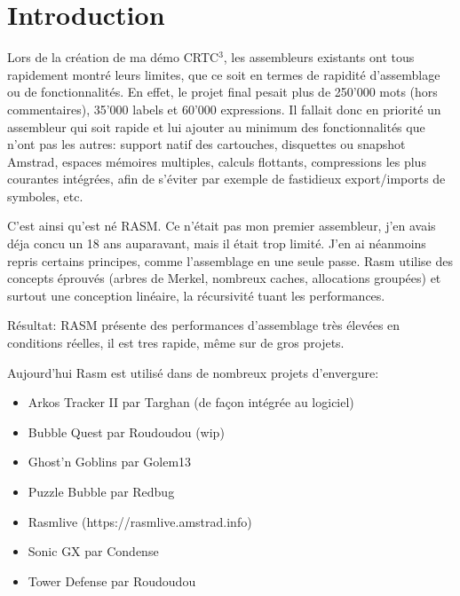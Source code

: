 \section{Introduction}

\begin{xfr}
Lors de la création de ma démo CRTC$^3$, les assembleurs existants ont tous rapidement montré leurs limites, que ce soit en termes de rapidité d'assemblage ou de fonctionnalités.
En effet, le projet final pesait plus de 250'000 mots (hors commentaires), 35'000 labels et 60'000 expressions.
Il fallait donc en priorité un assembleur qui soit rapide et lui ajouter au minimum des fonctionnalités que n'ont pas les autres: support natif des cartouches, disquettes ou snapshot Amstrad, espaces mémoires multiples, calculs flottants, compressions les plus courantes intégrées, afin de s'éviter par exemple de fastidieux export/imports de symboles, etc.

\medskip
C'est ainsi qu'est né RASM. Ce n'était pas mon premier assembleur, j'en avais déja concu un 18 ans auparavant, mais il était trop limité. J'en ai néanmoins repris certains principes, comme l'assemblage en une seule passe. Rasm utilise des concepts éprouvés (arbres de Merkel, nombreux caches, allocations groupées) et surtout une conception linéaire, la récursivité tuant les performances.

Résultat: RASM présente des performances d'assemblage très élevées en conditions réelles, il est tres rapide, même sur de gros projets. %

\medskip
Aujourd'hui Rasm est utilisé dans de nombreux projets d'envergure:
\begin{itemize}[noitemsep]
\item Arkos Tracker II par Targhan (de façon intégrée au logiciel)
\item Bubble Quest par Roudoudou (wip)
\item Ghost'n Goblins par Golem13
\item Puzzle Bubble par Redbug
\item Rasmlive (https://rasmlive.amstrad.info)
\item Sonic GX par Condense 
\item Tower Defense par Roudoudou
\end{itemize}

\end{xfr}

